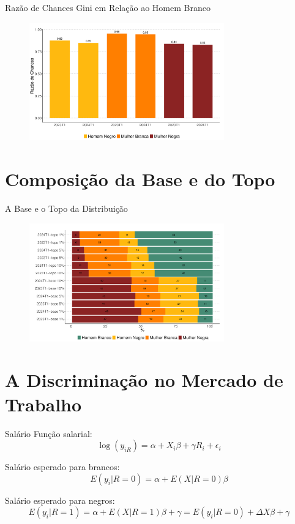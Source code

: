 \documentclass[10pt, xcolor=x11names,compress]{beamer}
\begin{document}
	
	\begin{frame}{Razão de Chances Gini em Relação ao Homem Branco}
		\begin{figure}
			\centering
			\includegraphics[width = 0.75\textwidth]{figures_output/frac_gini.pdf}
		\end{figure}
	\end{frame}
	
	\section{Composição da Base e do Topo}
	\begin{frame}{A Base e o Topo da Distribuição}
		\begin{figure}
			\centering
			\includegraphics[width = 0.75\textwidth]{figures_output/top_bottom.pdf}
		\end{figure}
	\end{frame}
	
\section{A Discriminação no Mercado de Trabalho}

\begin{frame}{Salário}
	Função salarial:
	\begin{equation}
		\log(y_{iR}) = \alpha + X_{i}\beta + \gamma R_{i} + \epsilon_{i}
	\end{equation}
	
	Salário esperado para brancos:
	\begin{equation}
		E(y_{i}|R=0) = \alpha + E(X|R=0)\beta
	\end{equation}
	
	Salário esperado para negros:
	\begin{equation}
		E(y_{i}|R=1) = \alpha + E(X|R=1)\beta + \gamma = E(y_{i}|R=0) + \Delta X\beta + \gamma
	\end{equation}
\end{frame}
\end{document}
